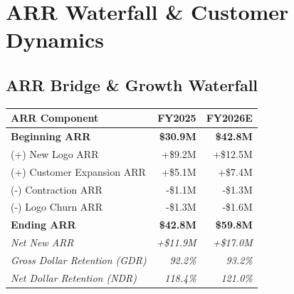 \documentclass[10pt,a4paper]{article}
\begin{document}
\vfill
\pagebreak


\section{ARR Waterfall \& Customer Dynamics}

\noindent
\begin{minipage}[t]{0.48\textwidth}
  \subsection{ARR Bridge \& Growth Waterfall}
  \vspace{-2pt}
  \begin{tcolorbox}[tablebox]
    \small
    \begin{tabularx}{\textwidth}{X r r}
      \toprule
      \textbf{ARR Component} & \textbf{FY2025} & \textbf{FY2026E} \\
      \midrule
      \textbf{Beginning ARR} & \textbf{\$30.9M} & \textbf{\$42.8M} \\
      \quad (+) New Logo ARR & +\$9.2M & +\$12.5M \\
      \quad (+) Customer Expansion ARR & +\$5.1M & +\$7.4M \\
      \quad (-) Contraction ARR & -\$1.1M & -\$1.3M \\
      \quad (-) Logo Churn ARR & -\$1.3M & -\$1.6M \\
      \midrule
      \textbf{Ending ARR} & \textbf{\$42.8M} & \textbf{\$59.8M} \\
      \quad \textit{Net New ARR} & \textit{+\$11.9M} & \textit{+\$17.0M} \\
      \quad \textit{Gross Dollar Retention (GDR)} & \textit{92.2\%} & \textit{93.2\%} \\
      \quad \textit{Net Dollar Retention (NDR)} & \textit{118.4\%} & \textit{121.0\%} \\
      \bottomrule
    \end{tabularx}
  \end{tcolorbox}
\end{minipage}%
\hfill
\end{document}

